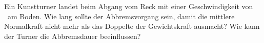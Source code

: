 Ein Kunstturner landet beim Abgang vom Reck mit einer Geschwindigkeit von \vLaO\ am Boden. Wie lang sollte der Abbremsvorgang sein, damit die mittlere Normalkraft nicht mehr als das Doppelte der Gewichtskraft ausmacht? Wie kann der Turner die Abbremsdauer beeinflussen?
